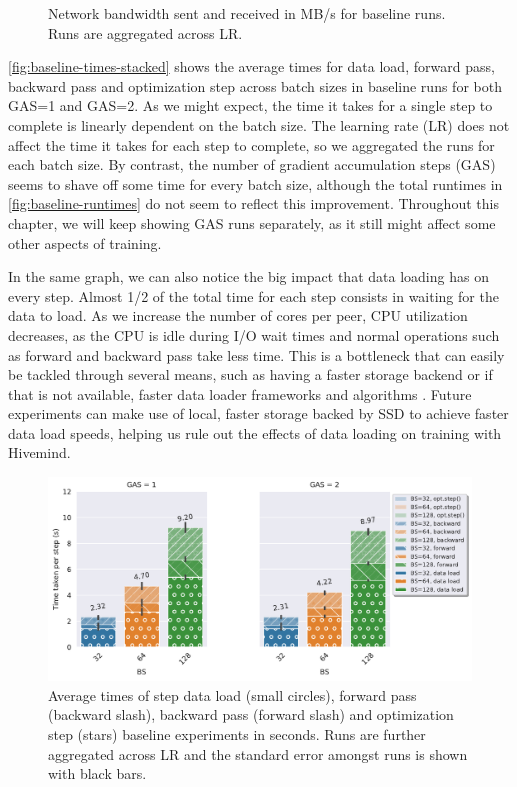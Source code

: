 \begin{figure}[h]
\begin{subfigure}[b]{0.475 \textwidth}
    \end{subfigure}%
    \hfill
    \caption{Network bandwidth sent and received in MB/s for baseline runs. Runs are aggregated across LR.}
\end{figure}

\autoref{fig:baseline-times-stacked} shows the average times for data load, forward pass, backward pass and optimization step across batch sizes in baseline runs for both GAS=1 and GAS=2.
As we might expect, the time it takes for a single step to complete is linearly dependent on the batch size.
The learning rate (LR) does not affect the time it takes for each step to complete, so we aggregated the runs for each batch size.
By contrast, the number of gradient accumulation steps (GAS) seems to shave off some time for every batch size, although the total runtimes in \autoref{fig:baseline-runtimes} do not seem to reflect this improvement.
Throughout this chapter, we will keep showing GAS runs separately, as it still might affect some other aspects of training.

In the same graph, we can also notice the big impact that data loading has on every step.
Almost 1/2 of the total time for each step consists in waiting for the data to load.
As we increase the number of cores per peer, CPU utilization decreases, as the CPU is idle during I/O wait times and normal operations such as forward and backward pass take less time.
This is a bottleneck that can easily be tackled through several means, such as having a faster storage backend or if that is not available, faster data loader frameworks and algorithms \cite{isenko2022bottleneck, leclerc2022ffcv}.
Future experiments can make use of local, faster storage backed by SSD to achieve faster data load speeds, helping us rule out the effects of data loading on training with Hivemind.

\begin{figure}[h]
    \centering
    \includegraphics[width=\textwidth]{./figures/06_barplot-times_baseline-16vCPUs-GAS-1.pdf}
    \caption{
        Average times of step data load (small circles), forward pass (backward slash), backward pass (forward slash) and optimization step (stars) baseline experiments in seconds.
        Runs are further aggregated across LR and the standard error amongst runs is shown with black bars.
    }
    \label{fig:baseline-times-stacked}
\end{figure}








